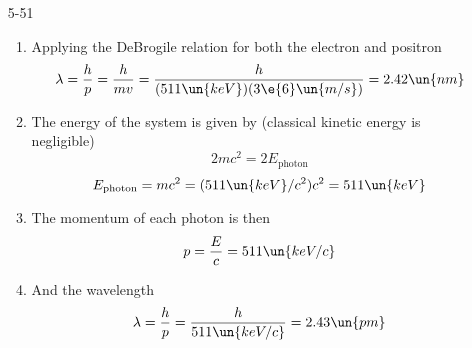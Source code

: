 \documentclass[]{2620hw}
\begin{document}
\begin{enumerate}
\item [5-51]
\begin{enumerate}
    \item Applying the DeBrogile relation for both the electron and positron
	\[
		\lambda = \frac{h}{p} = \frac{h}{mv} = \frac{h}{(511\un{keV})(3\e{6}\un{m/s})} = 2.42 \un{nm}
	\]
	\item The energy of the system is given by (classical kinetic energy is negligible) 
	\[
		2mc^2 = 2E_{\text{photon}}
	\]
	\[
		E_{\text{photon}} = mc^2 = (511\un{keV}/c^2)c^2 = 511\un{keV}
	\]
	\item The momentum of each photon is then 
	\[
		p = \frac{E}{c} = 511\un{keV/c}
	\]
	\item And the wavelength
	\[
		\lambda = \frac{h}{p} = \frac{h}{511\un{keV/c}} = 2.43 \un{pm}
	\]
	
\end{enumerate}

\end{enumerate}
\end{document}

